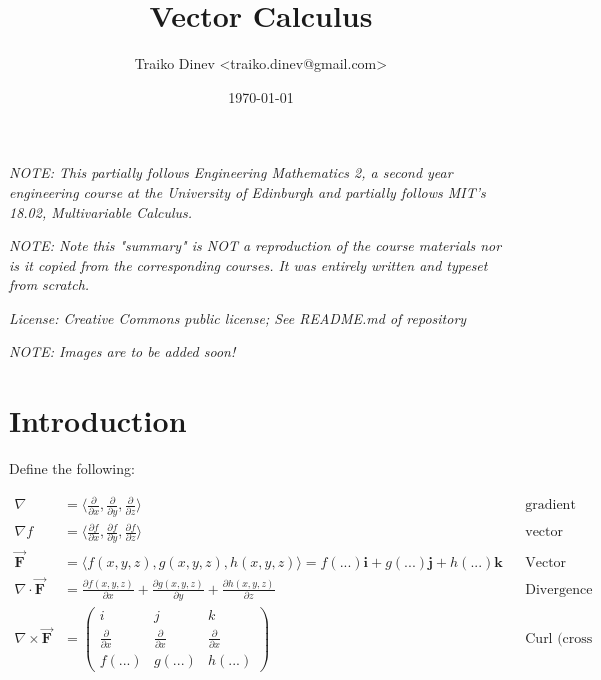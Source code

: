 \documentclass{article}
\title{Vector Calculus}
\date{\today}
\author{Traiko Dinev \textless traiko.dinev@gmail.com\textgreater}
\newcommand{\der}{\partial}
\newcommand{\del}{\nabla}
\newcommand{\vf}[1]{\vec{\mathbf{#1}}}
\begin{document}
\maketitle

\textit{NOTE: This partially follows Engineering Mathematics 2, a second year engineering course at the University of Edinburgh and partially follows MIT's 18.02, Multivariable Calculus.}

\textit{NOTE: Note this "summary" is NOT a reproduction of the course materials nor is it copied from the corresponding courses. It was entirely written and typeset from scratch.}

\textit{License: Creative Commons public license; See README.md of repository}

\textit{NOTE: Images are to be added soon!}

\section{Introduction}

Define the following:

\begin{align*}
    \del &=
        \bigg\langle
            \frac{\partial}{\partial x},
            \frac{\partial}{\partial y},
            \frac{\partial}{\partial z}
        \bigg\rangle
            && \text{gradient vector} \\
    \del f &=
        \bigg\langle
            \frac{\partial f}{\partial x},
            \frac{\partial f}{\partial y},
            \frac{\partial f}{\partial z}
        \bigg\rangle
            && \text{vector derivative}\\
    \vf{F} &=
        \langle
            f(x, y, z), g(x, y, z), h(x, y, z)
        \rangle =
        f(...) \mathbf{i} + g(...)\mathbf{j} + h(...) \mathbf{k}
            && \text{Vector field}\\
    \del \cdot \vf{F} &=
        \frac{\der f(x, y, z)}{\der x} +
        \frac{\der g(x, y, z)}{\der y} +
        \frac{\der h(x, y, z)}{\der z}
            && \text{Divergence (dot product)} \\
    \del \times \vf{F} &=
        \begin{pmatrix}
            i & j & k \\
            \frac{\der}{\der x} &
                \frac{\der}{\der x} &
                    \frac{\der}{\der x} \\
            f(...) & g(...) & h(...) 
        \end{pmatrix}
            && \text{Curl (cross product)} \\
\end{align*}
\end{document}
